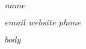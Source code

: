\documentclass[$if(fontsize)$$fontsize$$else$10pt$endif$,letterpaper]{article}
\begin{document}
\centerline{\Large\bfseries $name$}

\vspace{0.5em}

\centerline{\href{mailto: $email$}{$email$} {\large\textperiodcentered} \href{$website$}{$website$} {\large\textperiodcentered} \href{tel:$phone$}{$phone$} \ {\Large}}

$body$
\end{document}
